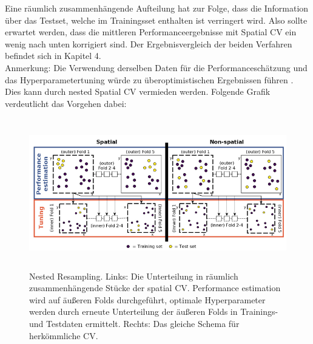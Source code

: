 Eine räumlich zusammenhängende Aufteilung hat zur Folge, dass die Information über das Testset, welche im Trainingsset enthalten ist verringert wird. Also sollte erwartet werden, dass die mittleren Performanceergebnisse mit Spatial CV ein wenig nach unten korrigiert sind. Der Ergebnisvergleich der beiden Verfahren befindet sich in Kapitel 4. \\
Anmerkung: Die Verwendung derselben Daten für die Performanceschätzung und das Hyperparametertuning würde zu überoptimistischen Ergebnissen führen \cite{nestedresmpling2}. Dies kann durch nested Spatial CV vermieden werden. Folgende Grafik verdeutlicht das Vorgehen dabei: 
\begin{figure}[H]
    \centering
    \includegraphics[width = 15cm, height = 6.5cm]{Figures/nestedresampling.PNG}
    \caption{Nested Resampling. Links: Die Unterteilung in räumlich zusammenhängende Stücke der spatial CV. Performance estimation wird auf äußeren Folds durchgeführt, optimale Hyperparameter werden durch erneute Unterteilung der äußeren Folds in Trainings- und Testdaten ermittelt. Rechts: Das gleiche Schema für herkömmliche CV. \cite{nestedresmpling2}}
    \label{nestedresamplingviz}
\end{figure}
